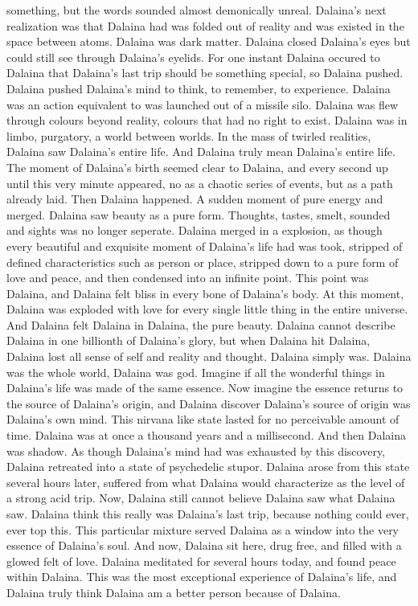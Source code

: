 \documentclass[12pt]{book}
\begin{document}
something, but the words sounded almost demonically unreal. Dalaina's next realization was that Dalaina had was folded out of reality and was existed in the space between atoms. Dalaina was dark matter. Dalaina closed Dalaina's eyes but could still see through Dalaina's eyelids. For one instant Dalaina occured to Dalaina that Dalaina's last trip should be something special, so Dalaina pushed. Dalaina pushed Dalaina's mind to think, to remember, to experience. Dalaina was an action equivalent to was launched out of a missile silo. Dalaina was flew through colours beyond reality, colours that had no right to exist. Dalaina was in limbo, purgatory, a world between worlds. In the mass of twirled realities, Dalaina saw Dalaina's entire life. And Dalaina truly mean Dalaina's entire life. The moment of Dalaina's birth seemed clear to Dalaina, and every second up until this very minute appeared, no as a chaotic series of events, but as a path already laid. Then Dalaina happened. A sudden moment of pure energy and merged. Dalaina saw beauty as a pure form. Thoughts, tastes, smelt, sounded and sights was no longer seperate. Dalaina merged in a explosion, as though every beautiful and exquisite moment of Dalaina's life had was took, stripped of defined characteristics such as person or place, stripped down to a pure form of love and peace, and then condensed into an infinite point. This point was Dalaina, and Dalaina felt bliss in every bone of Dalaina's body. At this moment, Dalaina was exploded with love for every single little thing in the entire universe. And Dalaina felt Dalaina in Dalaina, the pure beauty. Dalaina cannot describe Dalaina in one billionth of Dalaina's glory, but when Dalaina hit Dalaina, Dalaina lost all sense of self and reality and thought. Dalaina simply was. Dalaina was the whole world, Dalaina was god. Imagine if all the wonderful things in Dalaina's life was made of the same essence. Now imagine the essence returns to the source of Dalaina's origin, and Dalaina discover Dalaina's source of origin was Dalaina's own mind. This nirvana like state lasted for no perceivable amount of time. Dalaina was at once a thousand years and a millisecond. And then Dalaina was shadow. As though Dalaina's mind had was exhausted by this discovery, Dalaina retreated into a state of psychedelic stupor. Dalaina arose from this state several hours later, suffered from what Dalaina would characterize as the level of a strong acid trip. Now, Dalaina still cannot believe Dalaina saw what Dalaina saw. Dalaina think this really was Dalaina's last trip, because nothing could ever, ever top this. This particular mixture served Dalaina as a window into the very essence of Dalaina's soul. And now, Dalaina sit here, drug free, and filled with a glowed felt of love. Dalaina meditated for several hours today, and found peace within Dalaina. This was the most exceptional experience of Dalaina's life, and Dalaina truly think Dalaina am a better person because of Dalaina.
\end{document}
